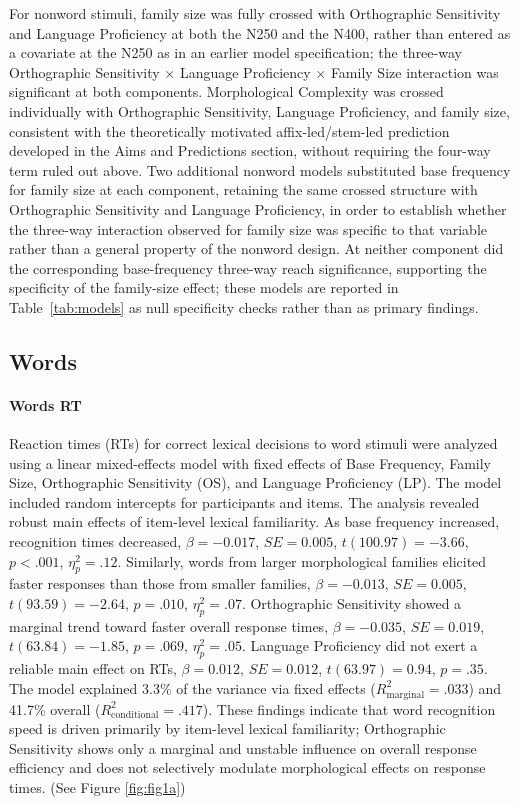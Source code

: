 \documentclass[utf8]{FrontiersinHarvard} %
\begin{document}
	For nonword stimuli, family size was fully crossed with Orthographic Sensitivity and Language Proficiency at both the N250 and the N400, rather than entered as a covariate at the N250 as in an earlier model specification; the three-way Orthographic Sensitivity $\times$ Language Proficiency $\times$ Family Size interaction was significant at both components. Morphological Complexity was crossed individually with Orthographic Sensitivity, Language Proficiency, and family size, consistent with the theoretically motivated affix-led/stem-led prediction developed in the Aims and Predictions section, without requiring the four-way term ruled out above. Two additional nonword models substituted base frequency for family size at each component, retaining the same crossed structure with Orthographic Sensitivity and Language Proficiency, in order to establish whether the three-way interaction observed for family size was specific to that variable rather than a general property of the nonword design. At neither component did the corresponding base-frequency three-way reach significance, supporting the specificity of the family-size effect; these models are reported in Table~\ref{tab:models} as null specificity checks rather than as primary findings.
	
	\subsection{Words}
	
	\paragraph*{Words RT}
	Reaction times (RTs) for correct lexical decisions to word stimuli were analyzed using a linear mixed-effects model with fixed effects of Base Frequency, Family Size, Orthographic Sensitivity (OS), and Language Proficiency (LP). The model included random intercepts for participants and items. The analysis revealed robust main effects of item-level lexical familiarity. As base frequency increased, recognition times decreased, $\beta = -0.017$, $SE = 0.005$, $t(100.97) = -3.66$, $p < .001$, $\eta^2_p = .12$. Similarly, words from larger morphological families elicited faster responses than those from smaller families, $\beta = -0.013$, $SE = 0.005$, $t(93.59) = -2.64$, $p = .010$, $\eta^2_p = .07$. Orthographic Sensitivity showed a marginal trend toward faster overall response times, $\beta = -0.035$, $SE = 0.019$, $t(63.84) = -1.85$, $p = .069$, $\eta^2_p = .05$. Language Proficiency did not exert a reliable main effect on RTs, $\beta = 0.012$, $SE = 0.012$, $t(63.97) = 0.94$, $p = .35$. The model explained 3.3\% of the variance via fixed effects ($R^2_{\mathrm{marginal}} = .033$) and 41.7\% overall ($R^2_{\mathrm{conditional}} = .417$). These findings indicate that word recognition speed is driven primarily by item-level lexical familiarity; Orthographic Sensitivity shows only a marginal and unstable influence on overall response efficiency and does not selectively modulate morphological effects on response times. (See Figure \ref{fig:fig1a})
	
\end{document}
